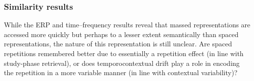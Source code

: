 





\subsubsection{Similarity results}

While the ERP and time--frequency results reveal that massed representations are accessed more quickly but perhaps to a lesser extent semantically than spaced representations, the nature of this representation is still unclear.  Are spaced repetitions remembered better due to essentially a repetition effect (in line with study-phase retrieval), or does temporocontextual drift play a role in encoding the repetition in a more variable manner (in line with contextual variability)?

